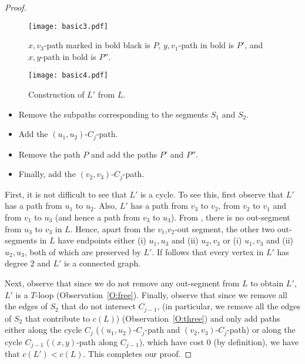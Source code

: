 \documentclass{article}
\numberwithin{claimcounter}{lemma}
\begin{document}
\begin{proof}
\begin{figure}
    \centering
    \texttt{[image: basic3.pdf]}
    \caption{$x,v_3$-path marked in bold black is $P$, $y,v_1$-path in bold is $P'$, and $x,y$-path in bold is $P''$.}
    \label{fig:basic3}
\end{figure}

\begin{figure}[!htb]
    \centering
    \texttt{[image: basic4.pdf]}
    \caption{Construction of $L'$ from $L$.}
    \label{fig:basic4}
\end{figure}

    \begin{itemize}
        \item Remove the subpaths corresponding to the segments $S_1$ and $S_2$.
        \item Add the $(u_1,u_2)$-$C_j$-path.
        \item Remove the path $P$ and add the paths $P'$ and $P''$.  
        \item Finally, add the $(v_2,v_3)$-$C_j$-path.
    \end{itemize}



    
    First, it is not difficult to see that $L'$ is a cycle.
    To see this, first observe that $L'$ has a path from $u_1$ to $u_2$. Also, $L'$ has a path from $v_3$ to $v_2$, from $v_2$ to $v_1$ and from $v_1$
 to $u_3$ (and hence a path from $v_3$ to $u_3$). From , there is no out-segment from $u_3$ to $v_3$ in $L$. Hence, apart from the $v_1$,$v_2$-out segment, the other two out-segments in $L$ have endpoints either (i) $u_1,u_3$ and (ii) $u_2, v_3$ or (i) $u_1,v_3$ and (ii) $u_2, u_3$, both of which are preserved by $L'$. If follows that every vertex in $L'$ has degree $2$ and $L'$ is a connected graph. 
    
    Next, observe that since we do not remove any out-segment from $L$ to obtain $L'$, $L'$ is a $T$-loop (Observation~\ref{O:free}). Finally, observe that since we remove all the edges of $S_2$ that do not intersect $C_{j-1}$, (in particular, we remove all the edges of $S_2$ that contribute to $c(L)$) (Observation~\ref{O:three}) and only add paths either along the cycle $C_j$ ($(u_1,u_2)$-$C_j$-path and $(v_2,v_3)$-$C_j$-path) or along the cycle $C_{j-1}$ ($(x,y)$-path along $C_{j-1}$), which have cost 0 (by definition), we have that $c(L')< c(L)$. This completes our proof.
\end{proof}
\end{document}
